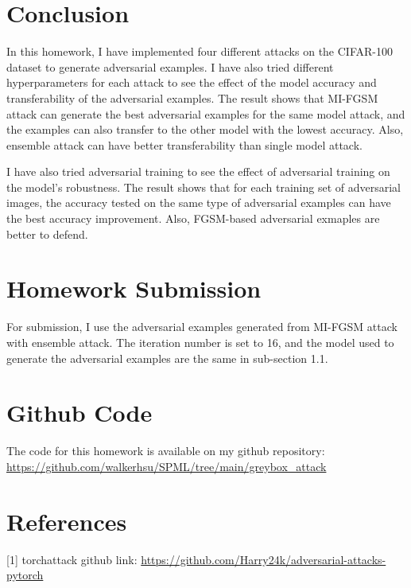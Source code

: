 \documentclass{article}
\begin{document}
\section{Conclusion}

In this homework, I have implemented four different attacks on the CIFAR-100 dataset to generate adversarial examples.
I have also tried different hyperparameters for each attack to see the effect of the model accuracy and transferability of the adversarial examples.
The result shows that MI-FGSM attack can generate the best adversarial examples for the same model attack, and the examples can also transfer to the other model with the lowest accuracy.
Also, ensemble attack can have better transferability than single model attack.

I have also tried adversarial training to see the effect of adversarial training on the model's robustness.
The result shows that for each training set of adversarial images, the accuracy tested on the same type of adversarial examples can have the best accuracy improvement.
Also, FGSM-based adversarial exmaples are better to defend.
\section*{Homework Submission}

For submission, I use the adversarial examples generated from MI-FGSM attack with ensemble attack.
The iteration number is set to 16, and the model used to generate the adversarial examples are the same in sub-section 1.1.

\section*{Github Code}

The code for this homework is available on my github repository: \\
\url{https://github.com/walkerhsu/SPML/tree/main/greybox_attack}

\section*{References}



{
\small


[1] torchattack github link: {\url{https://github.com/Harry24k/adversarial-attacks-pytorch}}

}
\end{document}
